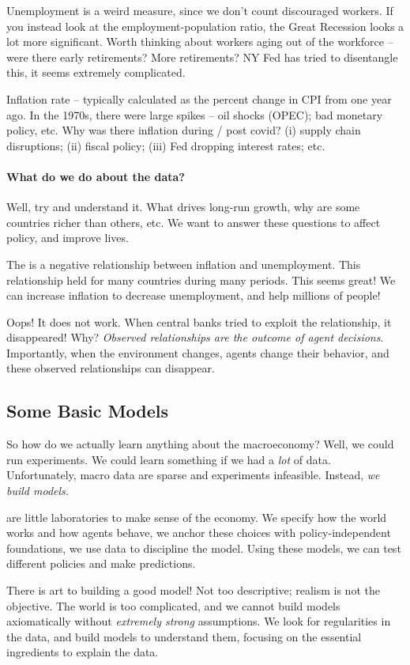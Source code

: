 \documentclass[10pt]{article}
\begin{document}
Unemployment is a weird measure, since we don't count discouraged workers. If you instead look at the employment-population ratio, the Great Recession looks a lot more significant. Worth thinking about workers aging out of the workforce -- were there early retirements? More retirements? NY Fed has tried to disentangle this, it seems extremely complicated. 

Inflation rate -- typically calculated as the percent change in CPI from one year ago. In the 1970s, there were large spikes -- oil shocks (OPEC); bad monetary policy, etc. Why was there inflation during / post covid? (i) supply chain disruptions; (ii) fiscal policy; (iii) Fed dropping interest rates; etc.

\paragraph{What do we do about the data?}

 Well, try and understand it. What drives long-run growth, why are some countries richer than others, etc. We want to answer these questions to affect policy, and improve lives. 

\begin{example}
	The  is a negative relationship between inflation and unemployment. This relationship held for many countries during many periods. This seems great! We can increase inflation to decrease unemployment, and help millions of people!
	
	
	Oops! It does not work. When central banks tried to exploit the relationship, it disappeared! Why? \emph{Observed relationships are the outcome of agent decisions}. Importantly, when the environment changes, agents change their behavior, and these observed relationships can disappear. 
\end{example}

\newpage
\subsection{Some Basic Models}

So how do we actually learn anything about the macroeconomy? Well, we could run experiments. We could learn something if we had a \emph{lot} of data. Unfortunately, macro data are sparse and experiments infeasible. Instead, \emph{we build models.}

\begin{definition}
	 are little laboratories to make sense of the economy. We specify how the world works and how agents behave, we anchor these choices with policy-independent foundations, we use data to discipline the model. Using these models, we can test different policies and make predictions.
	
	There is art to building a good model! Not too descriptive; realism is not the objective. The world is too complicated, and we cannot build models axiomatically without \emph{extremely strong} assumptions. We look for regularities in the data, and build models to understand them, focusing on the essential ingredients to explain the data.
\end{definition}
\end{document}
